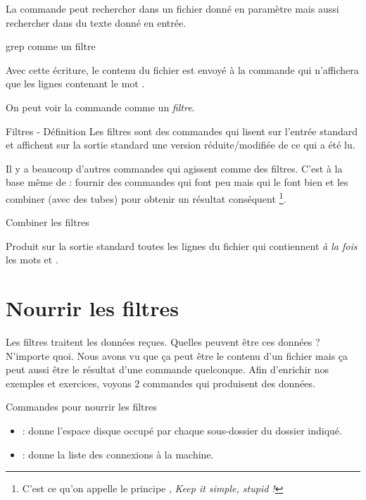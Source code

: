 \documentclass[a4paper,11pt]{style-esi/td}
\begin{document}
		La commande 
		peut rechercher dans un fichier donné en paramètre
		mais aussi rechercher dans du texte donné en entrée.

		\begin{Exemple}{grep comme un filtre}
			
			\medskip
			Avec cette écriture, le contenu du fichier 
			est envoyé à la commande  qui n'affichera
			que les lignes contenant le mot .
		\end{Exemple}

		On peut voir la commande comme un \emph{filtre}.

		\begin{theorie}{Filtres - Définition}
			Les filtres sont des commandes qui lisent sur l'entrée standard
			et affichent sur la sortie standard 
			une version réduite/modifiée de ce qui a été lu.
		\end{theorie}
	
		Il y a beaucoup d'autres commandes qui agissent comme des filtres.
		C'est à la base même de  : fournir des commandes qui font peu 
		mais qui le font bien et les combiner (avec des tubes)
		pour obtenir un résultat conséquent%
		\footnote{%
			C'est ce qu'on appelle le principe , 
			\emph{Keep it simple, stupid !}
		}.

\newpage

		\begin{Exemple}{Combiner les filtres}
			
			\medskip
			Produit sur la sortie standard toutes les lignes du fichier
			 qui contiennent \emph{à la fois}
			les mots  et .
		\end{Exemple}

	\section{Nourrir les filtres}
	
		Les filtres traitent les données reçues.
		Quelles peuvent être ces données ? N'importe quoi.
		Nous avons vu que ça peut être le contenu d'un fichier
		mais ça peut aussi être le résultat d'une commande quelconque.
		Afin d'enrichir nos exemples et exercices, 
		voyons 2 commandes qui produisent des données.

		\begin{theorie}{Commandes pour nourrir les filtres}
			\begin{itemize}
			\item 
				 : 
				donne l'espace disque occupé par chaque sous-dossier
				du dossier indiqué.
			\item 
				 : 
				donne la liste des connexions à la machine.
			\end{itemize}
		\end{theorie}
\end{document}
